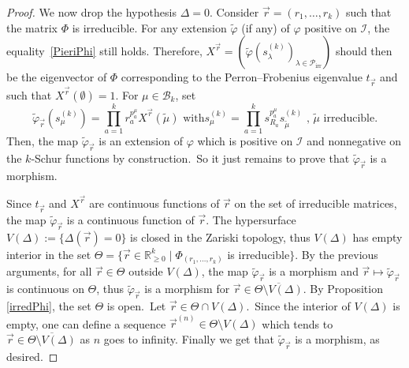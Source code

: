 \documentclass[ALCO,ThmDefs,Unicode,epreuves]{cedram}
\DeclareMathOperator{\irr}{irr}
\begin{document}
\begin{proof}
We now drop the hypothesis $\Delta=0$. Consider $\vec{r}=(r_{1},\ldots,r_{k})$
such that the matrix $\Phi$ is irreducible. For any extension $\widetilde
{\varphi}$ (if any) of $\varphi$ positive on $\mathcal{I}$, the 
equality~\eqref{PieriPhi} still holds. Therefore, $X^{\vec{r}}=(\widetilde{\varphi
}(s_{\lambda}^{(k)})_{\lambda\in\mathcal{P}_{\irr }})$ should then be
the eigenvector of $\Phi$ corresponding to the Perron--Frobenius eigenvalue
$t_{\vec{r}}$ and such that $X^{\vec{r}}(\emptyset)=1$. For $\mu\in
\mathcal{B}_{k}$, set
\begin{equation}
\label{expression_morphism}\widetilde{\varphi}_{\vec{r}}(s_{\mu}^{(k)}%
)=\prod_{a=1}^{k}r_{a}^{p_{a}^{\mu}}X^{\vec{r}}(\widetilde{\mu})\text{ with
}s_{\mu}^{(k)}=\prod_{a=1}^{k}s_{R_{a}}^{p_{a}^{\mu}}s_{\widetilde{\mu}}%
^{(k)}\text{ , }\tilde{\mu}\text{ irreducible.}%
\end{equation}
Then, the map $\widetilde{\varphi}_{\vec{r}}$ is an extension of $\varphi$
which is positive on $\mathcal{I}$ and nonnegative on the $k$-Schur functions
by construction.\ So it just remains to prove that $\widetilde{\varphi}%
_{\vec{r}}$ is a morphism.

Since $t_{\vec{r}}$ and $X^{\vec{r}}$ are continuous functions of $\vec{r}$ on
the set of irreducible matrices, the map $\widetilde{\varphi}_{\vec{r}}$ is a
continuous function of $\vec{r}$. The hypersurface $V(\Delta):=\{\Delta
(\vec{r})=0\}$ is closed in the Zariski topology, thus $V(\Delta)$ has empty
interior in the set $\Theta=\{\vec{r}\in\mathbb{R}_{\geq0}^{k}\mid\Phi
_{(r_{1},\ldots,r_{k})}$ is irreducible$\}$. By the previous arguments, for
all $\vec{r}\in\Theta$ outside $V(\Delta)$, the map $\widetilde{\varphi}%
_{\vec{r}}$ is a morphism and $\vec{r}\mapsto\widetilde{\varphi}_{\vec{r}}$ is
continuous on $\Theta$, thus $\widetilde{\varphi}_{\vec{r}}$ is a morphism for
$\vec{r}\in\overline{\Theta\setminus V(\Delta)}$. By Proposition
\ref{irredPhi}, the set $\Theta$ is open.\ Let $\vec{r}\in\Theta\cap
V(\Delta)$.\ Since the interior of $V(\Delta)$ is empty, one can define a
sequence $\vec{r}^{(n)}\in\Theta\setminus V(\Delta)$ which tends to $\vec
{r}\in\overline{\Theta\setminus V(\Delta)}$ as $n$ goes to infinity. Finally
we get that $\widetilde{\varphi}_{\vec{r}}$ is a morphism, as desired.


\end{proof}
\end{document}
